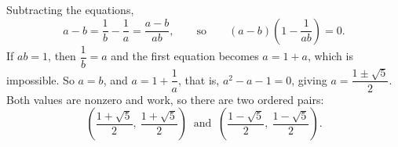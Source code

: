 Subtracting the equations,
\[a-b=\dfrac{1}{b}-\dfrac{1}{a}=\dfrac{a-b}{ab},\qquad\text{so}\qquad(a-b)\left(1-\dfrac{1}{ab}\right)=0 .\]
If $ab=1$, then $\dfrac{1}{b}=a$ and the first equation becomes $a=1+a$, which is impossible. So $a=b$, and $a=1+\dfrac{1}{a}$, that is, $a^2-a-1=0$, giving $a=\dfrac{1\pm\sqrt5}{2}$. Both values are nonzero and work, so there are two ordered pairs:
\[\boxed{\left(\dfrac{1+\sqrt5}{2},\ \dfrac{1+\sqrt5}{2}\right)\ \text{ and }\ \left(\dfrac{1-\sqrt5}{2},\ \dfrac{1-\sqrt5}{2}\right)}.\]
